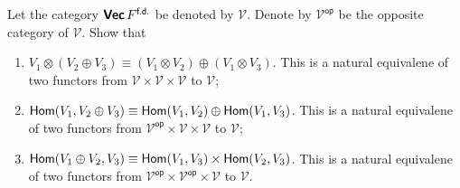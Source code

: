 \begin{problem}
Let the category $\operatorname{\text{\normalfont\bf\sffamily Vec}}{F}^{\operatorname{\text{\normalfont\sffamily f.d.}}}$ be denoted by $\mathcal{V}$. Denote by $\mathcal{V}^{\mathsf{op}}$ be the opposite category of $\mathcal{V}$. Show that
\begin{enumerate}
	\item $V_1 \otimes (V_2 \oplus V_3) \equiv (V_1 \otimes V_2) \oplus (V_1 \otimes V_3)$. This is a natural equivalene of two functors from $\mathcal{V} \times \mathcal{V} \times \mathcal{V}$ to $\mathcal{V}$;
	\item $\operatorname{\text{\normalfont\sffamily Hom}}(V_1, V_2 \oplus V_3) \equiv \operatorname{\text{\normalfont\sffamily Hom}}(V_1, V_2) \oplus \operatorname{\text{\normalfont\sffamily Hom}}(V_1, V_3)$. This is a natural equivalene of two functors from $\mathcal{V}^{\mathsf{op}} \times \mathcal{V} \times \mathcal{V}$ to $\mathcal{V}$;
	\item $\operatorname{\text{\normalfont\sffamily Hom}}(V_1 \oplus V_2, V_3) \equiv \operatorname{\text{\normalfont\sffamily Hom}}(V_1, V_3) \times \operatorname{\text{\normalfont\sffamily Hom}}(V_2, V_3)$. This is a natural equivalene of two functors from $\mathcal{V}^{\mathsf{op}} \times \mathcal{V}^{\mathsf{op}} \times \mathcal{V}$ to $\mathcal{V}$.
\end{enumerate}
\end{problem}